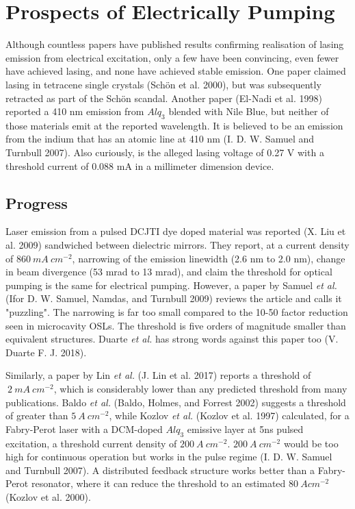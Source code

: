 \documentclass[
  letterpaper,
  DIV=11,
  numbers=noendperiod,
  oneside]{scrreprt}
\begin{document}
\hypertarget{sec-laser}{%
\section{Prospects of Electrically Pumping}\label{sec-laser}}

Although countless papers have published results confirming realisation
of lasing emission from electrical excitation, only a few have been
convincing, even fewer have achieved lasing, and none have achieved
stable emission. One paper claimed lasing in tetracene single crystals
(Schön et al. 2000), but was subsequently retracted as part of the Schön
scandal. Another paper (El-Nadi et al. 1998) reported a 410 nm emission
from \(Alq_3\) blended with Nile Blue, but neither of those materials
emit at the reported wavelength. It is believed to be an emission from
the indium that has an atomic line at 410 nm (I. D. W. Samuel and
Turnbull 2007). Also curiously, is the alleged lasing voltage of 0.27 V
with a threshold current of 0.088 mA in a millimeter dimension device.

\hypertarget{progress}{%
\subsection{Progress}\label{progress}}

Laser emission from a pulsed DCJTI dye doped material was reported (X.
Liu et al. 2009) sandwiched between dielectric mirrors. They report, at
a current density of \(860\ mA \ cm^{-2}\), narrowing of the emission
linewidth (2.6 nm to 2.0 nm), change in beam divergence (53 mrad to 13
mrad), and claim the threshold for optical pumping is the same for
electrical pumping. However, a paper by Samuel \emph{et al.} (Ifor D. W.
Samuel, Namdas, and Turnbull 2009) reviews the article and calls it
"puzzling". The narrowing is far too small compared to the 10-50 factor
reduction seen in microcavity OSLs. The threshold is five orders of
magnitude smaller than equivalent structures. Duarte \emph{et al.} has
strong words against this paper too (V. Duarte F. J. 2018).

Similarly, a paper by Lin \emph{et al.} (J. Lin et al. 2017) reports a
threshold of \(~2\ mA \ cm^{-2}\), which is considerably lower than any
predicted threshold from many publications. Baldo \emph{et al.} (Baldo,
Holmes, and Forrest 2002) suggests a threshold of greater than
\(5\ A \ cm^{-2}\), while Kozlov \emph{et al.} (Kozlov et al. 1997)
calculated, for a Fabry-Perot laser with a DCM-doped \(Alq_3\) emissive
layer at 5ns pulsed excitation, a threshold current density of
\(200\ A\ cm^{-2}\). \(200\ A\ cm^{-2}\) would be too high for
continuous operation but works in the pulse regime (I. D. W. Samuel and
Turnbull 2007). A distributed feedback structure works better than a
Fabry-Perot resonator, where it can reduce the threshold to an estimated
\(80\ A cm^{-2}\) (Kozlov et al. 2000).
\end{document}

